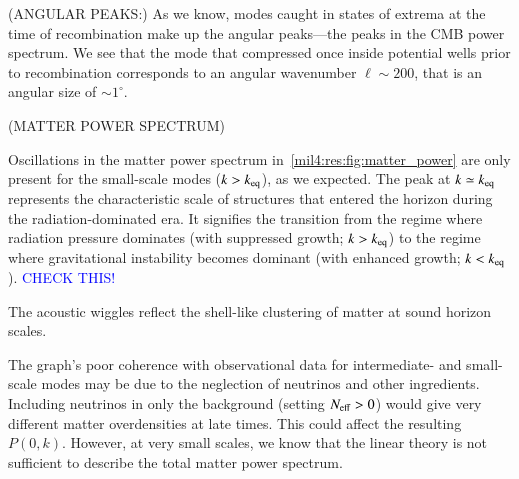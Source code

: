 (ANGULAR PEAKS:) As we know, modes caught in states of extrema at the time of recombination make up the angular peaks---the peaks in the CMB power spectrum. We see that the mode that compressed once inside potential wells prior to recombination corresponds to an angular wavenumber $\ell\sim 200$, that is an angular size of $\sim 1^\circ$. 



(MATTER POWER SPECTRUM)

Oscillations in the matter power spectrum in~\cref{mil4:res:fig:matter_power} are only present for the small-scale modes ($k>k_\mathrm{eq}$), as we expected. The peak at $k\simeq k_\mathrm{eq}$ represents the characteristic scale of structures that entered the horizon during the radiation-dominated era. It signifies the transition from the regime where radiation pressure dominates (with suppressed growth; $k>k_\mathrm{eq}$) to the regime where gravitational instability becomes dominant (with enhanced growth; $k<k_\mathrm{eq}$). \textcolor{blue}{CHECK THIS!} 

The acoustic wiggles reflect the shell-like clustering of matter at sound horizon scales. 

The graph's poor coherence with observational data for intermediate- and small-scale modes may be due to the neglection of neutrinos and other ingredients. Including neutrinos in only the background (setting $N_\mathrm{eff}> 0$) would give very different matter overdensities at late times. This could affect the resulting $P(0,k)$. However, at very small scales, we know that the linear theory is not sufficient to describe the total matter power spectrum.
